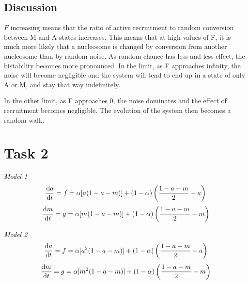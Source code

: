 \documentclass{article}
\begin{document}
\subsection{Discussion}
$F$ increasing means that the ratio of active recruitment to random conversion between M and A states increases. This means that at high values of F, it is much more likely that a nucleosome is changed by conversion from another nucleosome than by random noise. As random chance has less and less effect, the bistability becomes more pronounced. In the limit, as F approaches infinity, the noise will become negligible and the system will tend to end up in a state of only A or M, and stay that way indefinitely. 

In the other limit, as F approaches 0, the noise dominates and the effect of recruitment becomes negligible. The evolution of the system then becomes a random walk. 



\section{Task 2}
\textit{Model 1}
\begin{equation}
	\dv {a}{t} = f = \alpha[a(1-a-m)] + (1-\alpha )\left(\frac{1-a-m}{2}  - a\right)
\end{equation}
\begin{equation}
	\dv {m}{t} = g = \alpha[m(1-a-m)] + (1-\alpha )\left(\frac{1-a-m}{2}  - m\right)
\end{equation}



\textit{Model 2}
\begin{equation}
	\dv {a}{t} = f = \alpha[a^2(1-a-m)] + (1-\alpha )\left(\frac{1-a-m}{2}  - a\right)
\end{equation}
\begin{equation}
	\dv {m}{t} = g = \alpha[m^2(1-a-m)] + (1-\alpha )\left(\frac{1-a-m}{2}  - m\right)
\end{equation}
\end{document}
